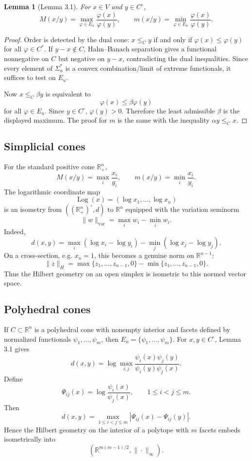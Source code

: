 \documentclass[11pt]{article}
\newtheorem{lemma}{Lemma}
\newcommand{\R}{\mathbb{R}}
\DeclareMathOperator{\Log}{Log}
\begin{document}
\begin{lemma}[Lemma 3.1]
For \(x\in V\) and \(y\in C^\circ\),
\[
  M(x/y)=\max_{\varphi\in E_u}\frac{\varphi(x)}{\varphi(y)},
  \qquad
  m(x/y)=\min_{\varphi\in E_u}\frac{\varphi(x)}{\varphi(y)}.
\]
\end{lemma}

\begin{proof}
Order is detected by the dual cone: \(x\le_C y\) if and only if \(\varphi(x)\le\varphi(y)\) for all \(\varphi\in C^*\).  If \(y-x\notin C\), Hahn--Banach separation gives a functional nonnegative on \(C\) but negative on \(y-x\), contradicting the dual inequalities.  Since every element of \(\Sigma_u^*\) is a convex combination/limit of extreme functionals, it suffices to test on \(E_u\).

Now \(x\le_C \beta y\) is equivalent to
\[
  \varphi(x)\le \beta\varphi(y)
\]
for all \(\varphi\in E_u\).  Since \(y\in C^\circ\), \(\varphi(y)>0\).  Therefore the least admissible \(\beta\) is the displayed maximum.  The proof for \(m\) is the same with the inequality \(\alpha y\le_C x\).
\end{proof}

\subsection{Simplicial cones}
For the standard positive cone \(\R_+^n\),
\[
  M(x/y)=\max_i\frac{x_i}{y_i},
  \qquad
  m(x/y)=\min_i\frac{x_i}{y_i}.
\]
The logarithmic coordinate map
\[
  \Log(x)=(\log x_1,\ldots,\log x_n)
\]
is an isometry from \(((\R_+^n)^\circ,d)\) to \(\R^n\) equipped with the variation seminorm
\[
  \|w\|_{\mathrm{var}}=\max_i w_i-\min_i w_i.
\]
Indeed,
\[
  d(x,y)=\max_i(\log x_i-\log y_i)-\min_j(\log x_j-\log y_j).
\]
On a cross-section, e.g. \(x_n=1\), this becomes a genuine norm on \(\R^{n-1}\):
\[
  \|z\|_H=\max\{z_1,
\ldots,z_{n-1},0\}-\min\{z_1,
\ldots,z_{n-1},0\}.
\]
Thus the Hilbert geometry on an open simplex is isometric to this normed vector space.

\subsection{Polyhedral cones}
If \(C\subset\R^n\) is a polyhedral cone with nonempty interior and facets defined by normalized functionals \(\psi_1,
\ldots,\psi_m\), then \(E_u=\{\psi_1,
\ldots,\psi_m\}\).  For \(x,y\in C^\circ\), Lemma 3.1 gives
\[
  d(x,y)=\log\max_{i,j}\frac{\psi_i(x)\psi_j(y)}{\psi_i(y)\psi_j(x)}.
\]
Define
\[
  \Psi_{ij}(x)=\log\frac{\psi_i(x)}{\psi_j(x)},
  \qquad 1\le i<j\le m.
\]
Then
\[
  d(x,y)=\max_{1\le i<j\le m}|\Psi_{ij}(x)-\Psi_{ij}(y)|.
\]
Hence the Hilbert geometry on the interior of a polytope with \(m\) facets embeds isometrically into
\[
  (\R^{m(m-1)/2},\|\cdot\|_\infty).
\]
\end{document}
